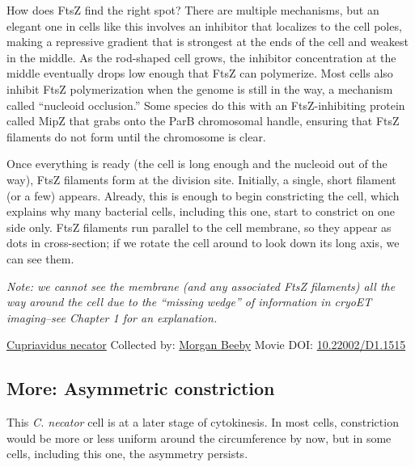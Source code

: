\documentclass[]{tufte-book}
\begin{document}
How does FtsZ find the right spot? There are multiple mechanisms, but an elegant one in cells like this involves an inhibitor that localizes to the cell poles, making a repressive gradient that is strongest at the ends of the cell and weakest in the middle. As the rod-shaped cell grows, the inhibitor concentration at the middle eventually drops low enough that FtsZ can polymerize. Most cells also inhibit FtsZ polymerization when the genome is still in the way, a mechanism called ``nucleoid occlusion.'' Some species do this with an FtsZ-inhibiting protein called MipZ that grabs onto the ParB chromosomal handle, ensuring that FtsZ filaments do not form until the chromosome is clear.

Once everything is ready (the cell is long enough and the nucleoid out of the way), FtsZ filaments form at the division site. Initially, a single, short filament (or a few) appears. Already, this is enough to begin constricting the cell, which explains why many bacterial cells, including this one, start to constrict on one side only. FtsZ filaments run parallel to the cell membrane, so they appear as dots in cross-section; if we rotate the cell around to look down its long axis, we can see them.

\emph{Note: we cannot see the membrane (and any associated FtsZ filaments) all the way around the cell due to the ``missing wedge'' of information in cryoET imaging--see Chapter 1 for an explanation.}



\hypertarget{htmlwidget-87231c15a606f2be22af}{}

\label{fig:5-9}\protect\hyperlink{tree}{Cupriavidus necator} Collected by: \protect\hyperlink{morgan_beeby}{Morgan Beeby} Movie DOI: \href{https://doi.org/10.22002/D1.1515}{10.22002/D1.1515}

\hypertarget{Asymmetric_constriction}{%
\subsection*{More: Asymmetric constriction}\label{Asymmetric_constriction}}

This \emph{C. necator} cell is at a later stage of cytokinesis. In most cells, constriction would be more or less uniform around the circumference by now, but in some cells, including this one, the asymmetry persists.



\hypertarget{htmlwidget-df5359692c7f84377d77}{}
\end{document}
